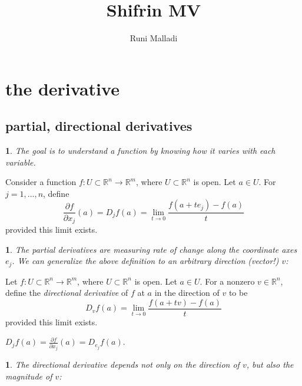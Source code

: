 \documentclass[12pt]{article}
\title{Shifrin MV}
\author{Runi Malladi}
\newtheorem{para}[theorem]{}
\begin{document}
\maketitle

\section{the derivative} %

\subsection{partial, directional derivatives} %

\begin{para}
	The goal is to understand a function by knowing how it varies with each variable.
\end{para}

\begin{definition}
	Consider a function $f:U\subset\mathbb{R}^n\to\mathbb{R}^m$, where $U\subset\mathbb{R}^n$ is open. Let $a\in U$. For $j=1,\dots, n$, define
	\begin{equation*}
		\frac{\partial f}{\partial x_j}(a) = D_jf(a) = \lim_{t\to 0}\frac{f(a+te_j)-f(a)}{t}
	\end{equation*}
	provided this limit exists.
\end{definition}

\begin{para}
	The partial derivatives are measuring rate of change along the coordinate axes $e_j$. We can generalize the above definition to an arbitrary direction (vector!) $v$:
\end{para}

\begin{definition}
	Let $f:U\subset \mathbb{R}^n\to\mathbb{R}^m$, where $U\subset\mathbb{R}^n$ is open. Let $a\in U$. For a nonzero $v\in\mathbb{R}^n$, define the \emph{directional derivative} of $f$ at $a$ in the direction of $v$ to be 
	\begin{equation*}
		D_vf(a) = \lim_{t\to 0}\frac{f(a+tv)-f(a)}{t}
	\end{equation*}
	provided this limit exists.
\end{definition}

\begin{remark}
	$D_j f(a) = \frac{\partial f}{\partial x_j}(a) = D_{e_j}f(a)$.
\end{remark}

\begin{para}
	The directional derivative depends not only on the direction of $v$, but also the magnitude of $v$:
\end{para}
\end{document}
